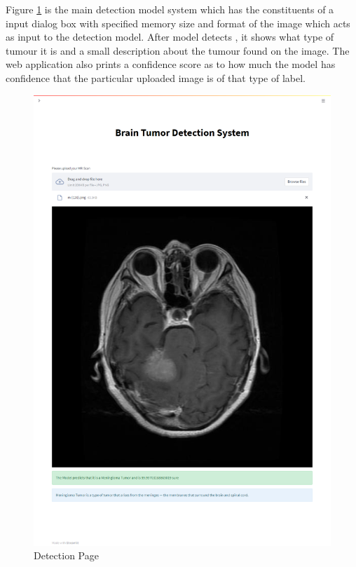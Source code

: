 Figure \ref{fig:page3} is the main detection model system which has the constituents of a input dialog box with specified memory size and format of the image which acts as input to the detection model. After model detects , it shows what type of tumour it is and a small description about the tumour found on the image. The web application also prints a confidence score as to how much the model has confidence that the particular uploaded image is of that type of label. 
\begin{figure}[H]
\includegraphics[scale=0.22]{Photos/Resule_meni_web.png}
\caption{Detection Page} \label{fig:page3}
\end{figure}


